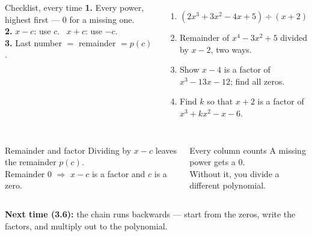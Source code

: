 \documentclass[aspectratio=169, 11pt]{beamer}
\begin{document}
\begin{frame}[t, plain]

  \begin{columns}[T]
      \begin{block}{Checklist, every time}
        \textbf{1.} Every power, highest first --- $0$ for a missing one.\\[3pt]
        \textbf{2.} $x - c$: use $c$. \ $x + c$: use $-c$.\\[3pt]
        \textbf{3.} Last number $=$ remainder $= p(c)$.
      \end{block}
      \begin{enumerate}\setlength{\itemsep}{6pt}
        \setcounter{enumi}{14}
        \item $(2x^3 + 3x^2 - 4x + 5) \div (x + 2)$
        \item Remainder of $x^4 - 3x^2 + 5$ divided by $x - 2$, two ways.
        \item Show $x - 4$ is a factor of $x^3 - 13x - 12$; find all zeros.
        \item Find $k$ so that $x + 2$ is a factor of $x^3 + kx^2 - x - 6$.
      \end{enumerate}
  \end{columns}
\end{frame}

\begin{frame}[t, plain]

  \begin{columns}[T]
      \begin{block}{Remainder and factor}
        Dividing by $x - c$ leaves the remainder $p(c)$.\\[3pt]
        Remainder $0$ $\Rightarrow$ $x - c$ is a factor and $c$ is a zero.
      \end{block}
      \begin{block}{Every column counts}
        A missing power gets a $0$.\\[3pt]
        Without it, you divide a different polynomial.
      \end{block}
  \end{columns}

  \bigskip
  \textbf{Next time (3.6):} the chain runs backwards --- start from the zeros, write the factors,
  and multiply out to the polynomial.
\end{frame}
\end{document}
